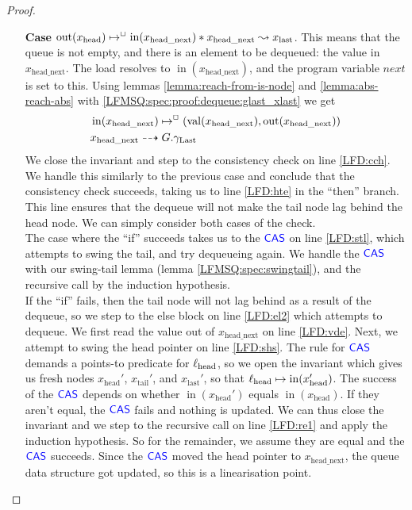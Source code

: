 \documentclass[a4paper, 10pt]{report}
\theoremstyle{definition}
\newcommand{\locN}[1]{\loc_{\mathrm{#1}}}
\newcommand{\lochead}{\locN{head}}
\newcommand{\nIn}[1]{\operatorname{in}(#1)}
\newcommand{\nVal}[1]{\operatorname{val}(#1)}
\newcommand{\nOut}[1]{\operatorname{out}(#1)}
\newcommand{\node}{x}
\newcommand{\nodeN}[1]{\node_{\mathrm{#1}}}
\newcommand{\nodehead}{\nodeN{head}}
\newcommand{\nodetail}{\nodeN{tail}}
\newcommand{\nodelast}{\nodeN{last}}
\newcommand{\nodeheadnext}{\nodeN{head\_next}}
\newcommand{\Qg}{G}
\newcommand{\glast}{\gname_{\mathrm{Last}}}
\newcommand{\isNode}[1]{\nIn{#1} \mapsto^{\persistently} (\nVal{#1}, \nOut{#1})}
\newcommand{\reach}[2]{#1 \leadsto #2}
\newcommand{\ar}[2]{#1 \dashrightarrow #2}
\begin{document}
\begin{proof}
\begin{itemize}
\begin{itemize}
      \item[\textbf{Case}] $\nOut{\nodehead} \mapsto^{\persistently} \nIn{\nodeheadnext} \star{} \reach{\nodeheadnext}{\nodelast}$. This means that the queue is not empty, and there is an element to be dequeued: the value in $\nodeheadnext$. The load resolves to $\nIn{\nodeheadnext}$, and the program variable $next$ is set to this. Using lemmas \ref{lemma:reach-from-is-node} and \ref{lemma:abs-reach-abs} with \ref{LFMSQ:spec:proof:dequeue:glast_xlast} we get
      \begin{align}
        &\isNode{\nodeheadnext}\label{LFMSQ:spec:proof:dequeue:x_headnext_node}\\
        &\ar{\nodeheadnext}{\Qg.\glast}\label{LFMSQ:spec:proof:dequeue:x_headnext_glast}
      \end{align}
      We close the invariant and step to the consistency check on line \ref{LFD:cch}. We handle this similarly to the previous case and conclude that the consistency check succeeds, taking us to line \ref{LFD:hte} in the ``then'' branch. This line ensures that the dequeue will not make the tail node lag behind the head node. We can simply consider both cases of the check.\\
      The case where the ``if'' succeeds takes us to the $\textsf{\color{blue} CAS}$ on line \ref{LFD:stl}, which attempts to swing the tail, and try dequeueing again. We handle the $\textsf{\color{blue} CAS}$ with our swing-tail lemma (lemma \ref{LFMSQ:spec:swingtail}), and the recursive call by the induction hypothesis.\\
      If the ``if'' fails, then the tail node will not lag behind as a result of the dequeue, so we step to the else block on line \ref{LFD:el2} which attempts to dequeue. We first read the value out of $\nodeheadnext$ on line \ref{LFD:vde}. Next, we attempt to swing the head pointer on line \ref{LFD:shs}. The rule for $\textsf{\color{blue} CAS}$ demands a points-to predicate for $\lochead$, so we open the invariant which gives us fresh nodes $\nodehead'$, $\nodetail'$, and $\nodelast'$, so that $\lochead \mapsto \nIn{\nodehead'}$. The success of the $\textsf{\color{blue} CAS}$ depends on whether $\nIn{\nodehead'}$ equals $\nIn{\nodehead}$. If they aren't equal, the $\textsf{\color{blue} CAS}$ fails and nothing is updated. We can thus close the invariant and we step to the recursive call on line \ref{LFD:re1} and apply the induction hypothesis. So for the remainder, we assume they are equal and the $\textsf{\color{blue} CAS}$ succeeds. Since the $\textsf{\color{blue} CAS}$ moved the head pointer to $\nodeheadnext$, the queue data structure got updated, so this is a linearisation point.\\

\end{itemize}
\end{itemize}
\end{proof}
\end{document}
